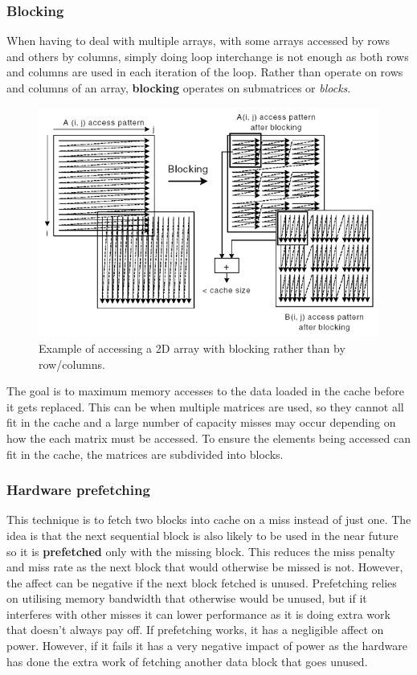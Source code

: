 \documentclass[11pt]{article}
\begin{document}
\subsubsection*{Blocking}
When having to deal with multiple arrays, with some arrays accessed by rows and others by columns, simply doing loop interchange is not enough as both rows and columns are used in each iteration of the loop. Rather than operate on rows and columns of an array, \textbf{blocking} operates on submatrices or \textit{blocks}.
\begin{figure}[H]
  \centering
  \includegraphics[width=1\textwidth, keepaspectratio]{imgs/cache-blocking.jpg}
  \caption{Example of accessing a 2D array with blocking rather than by row/columns.}
\end{figure}
\noindent
The goal is to maximum memory accesses to the data loaded in the cache before it gets replaced. This can be when multiple matrices are used, so they cannot all fit in the cache and a large number of capacity misses may occur depending on how the each matrix must be accessed. To ensure the elements being accessed can fit in the cache, the matrices are subdivided into blocks. 

\subsubsection{Hardware prefetching}
This technique is to fetch two blocks into cache on a miss instead of just one. The idea is that the next sequential block is also likely to be used in the near future so it is \textbf{prefetched} only with the missing block. This reduces the miss penalty and miss rate as the next block that would otherwise be missed is not. However, the affect can be negative if the next block fetched is unused.
\n
Prefetching relies on utilising memory bandwidth that otherwise would be unused, but if it interferes with other misses it can lower performance as it is doing extra work that doesn't always pay off. If prefetching works, it has a negligible affect on power. However, if it fails it has a very negative impact of power as the hardware has done the extra work of fetching another data block that goes unused.
\end{document}
